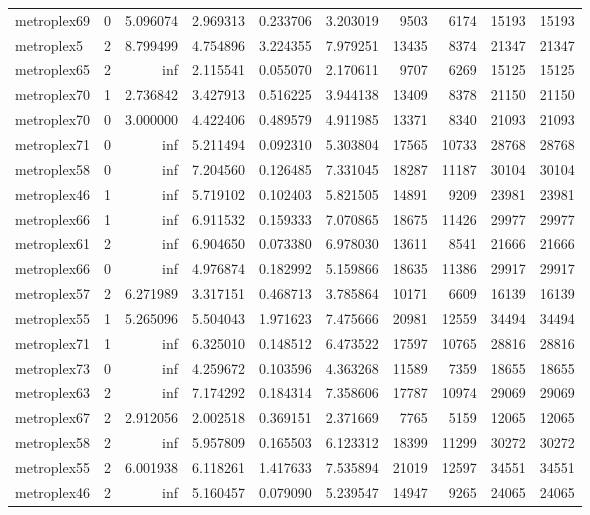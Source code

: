 \begin{longtable}{|l|r|r|r|r|r|r|r|r|r|}
metroplex69 & 0 & 5.096074 & 2.969313 & 0.233706 & 3.203019 & 9503 & 6174 & 15193 & 15193 \\
metroplex5 & 2 & 8.799499 & 4.754896 & 3.224355 & 7.979251 & 13435 & 8374 & 21347 & 21347 \\
metroplex65 & 2 & inf & 2.115541 & 0.055070 & 2.170611 & 9707 & 6269 & 15125 & 15125 \\
metroplex70 & 1 & 2.736842 & 3.427913 & 0.516225 & 3.944138 & 13409 & 8378 & 21150 & 21150 \\
metroplex70 & 0 & 3.000000 & 4.422406 & 0.489579 & 4.911985 & 13371 & 8340 & 21093 & 21093 \\
metroplex71 & 0 & inf & 5.211494 & 0.092310 & 5.303804 & 17565 & 10733 & 28768 & 28768 \\
metroplex58 & 0 & inf & 7.204560 & 0.126485 & 7.331045 & 18287 & 11187 & 30104 & 30104 \\
metroplex46 & 1 & inf & 5.719102 & 0.102403 & 5.821505 & 14891 & 9209 & 23981 & 23981 \\
metroplex66 & 1 & inf & 6.911532 & 0.159333 & 7.070865 & 18675 & 11426 & 29977 & 29977 \\
metroplex61 & 2 & inf & 6.904650 & 0.073380 & 6.978030 & 13611 & 8541 & 21666 & 21666 \\
metroplex66 & 0 & inf & 4.976874 & 0.182992 & 5.159866 & 18635 & 11386 & 29917 & 29917 \\
metroplex57 & 2 & 6.271989 & 3.317151 & 0.468713 & 3.785864 & 10171 & 6609 & 16139 & 16139 \\
metroplex55 & 1 & 5.265096 & 5.504043 & 1.971623 & 7.475666 & 20981 & 12559 & 34494 & 34494 \\
metroplex71 & 1 & inf & 6.325010 & 0.148512 & 6.473522 & 17597 & 10765 & 28816 & 28816 \\
metroplex73 & 0 & inf & 4.259672 & 0.103596 & 4.363268 & 11589 & 7359 & 18655 & 18655 \\
metroplex63 & 2 & inf & 7.174292 & 0.184314 & 7.358606 & 17787 & 10974 & 29069 & 29069 \\
metroplex67 & 2 & 2.912056 & 2.002518 & 0.369151 & 2.371669 & 7765 & 5159 & 12065 & 12065 \\
metroplex58 & 2 & inf & 5.957809 & 0.165503 & 6.123312 & 18399 & 11299 & 30272 & 30272 \\
metroplex55 & 2 & 6.001938 & 6.118261 & 1.417633 & 7.535894 & 21019 & 12597 & 34551 & 34551 \\
metroplex46 & 2 & inf & 5.160457 & 0.079090 & 5.239547 & 14947 & 9265 & 24065 & 24065 \\

\end{longtable}
